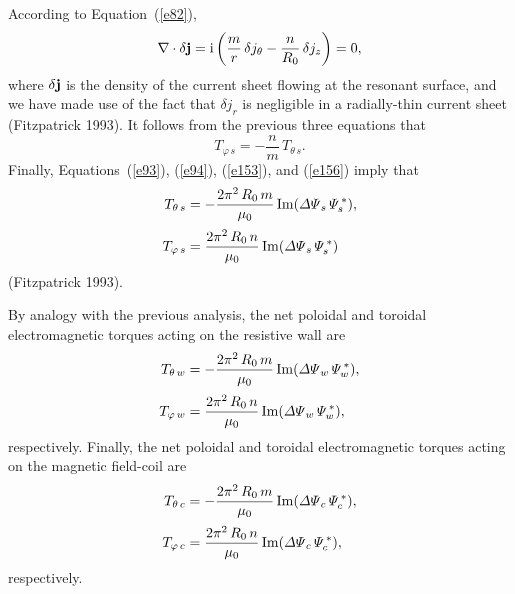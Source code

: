 \documentclass[notitlepage,12pt]{article}
\begin{document}
According to Equation~(\ref{e82}), 
\begin{equation}
\nabla \cdot \delta {\bf j} = {\rm i}\left(\frac{m}{r}\,\delta j_\theta - \frac{n}{R_0}\,\delta j_z\right) = 0,
\end{equation}
where $\delta{\bf j}$ is the density of the current sheet flowing at the resonant surface, and we have made use
of the fact that $\delta j_r$ is negligible in a radially-thin current sheet (Fitzpatrick 1993). 
 It follows from the previous three equations that
\begin{equation}\label{e156}
T_{\varphi\,s} = - \frac{n}{m}\,T_{\theta\,s}.
\end{equation}
Finally, Equations~(\ref{e93}), (\ref{e94}), (\ref{e153}), and (\ref{e156}) imply that
\begin{align}\label{e157}
T_{\theta\,s} &= -\frac{2\pi^2\,R_0\,m}{\mu_0}\,{\rm Im}({\mit\Delta\Psi}_s\,{\mit\Psi}_s^{\,\ast}),\\[0.5ex]
T_{\varphi\,s} &= \frac{2\pi^2\,R_0\,n}{\mu_0}\,{\rm Im}({\mit\Delta\Psi}_s\,{\mit\Psi}_s^{\,\ast})\label{e158}
\end{align}
(Fitzpatrick 1993).

By analogy with the previous analysis,  the net poloidal and toroidal electromagnetic torques acting on the
resistive wall are 
\begin{align}
T_{\theta\,w} &= -\frac{2\pi^2\,R_0\,m}{\mu_0}\,{\rm Im}({\mit\Delta\Psi}_w\,{\mit\Psi}_w^{\,\ast}),\\[0.5ex]
T_{\varphi\,w} &= \frac{2\pi^2\,R_0\,n}{\mu_0}\,{\rm Im}({\mit\Delta\Psi}_w\,{\mit\Psi}_w^{\,\ast}),
\end{align}
respectively. 
Finally, 
the net poloidal and toroidal electromagnetic torques acting on the
magnetic field-coil are 
\begin{align}
T_{\theta\,c} &= -\frac{2\pi^2\,R_0\,m}{\mu_0}\,{\rm Im}({\mit\Delta\Psi}_c\,{\mit\Psi}_c^{\,\ast}),\\[0.5ex]
T_{\varphi\,c} &= \frac{2\pi^2\,R_0\,n}{\mu_0}\,{\rm Im}({\mit\Delta\Psi}_c\,{\mit\Psi}_c^{\,\ast}),\label{e166}
\end{align}
respectively. 
\end{document}
